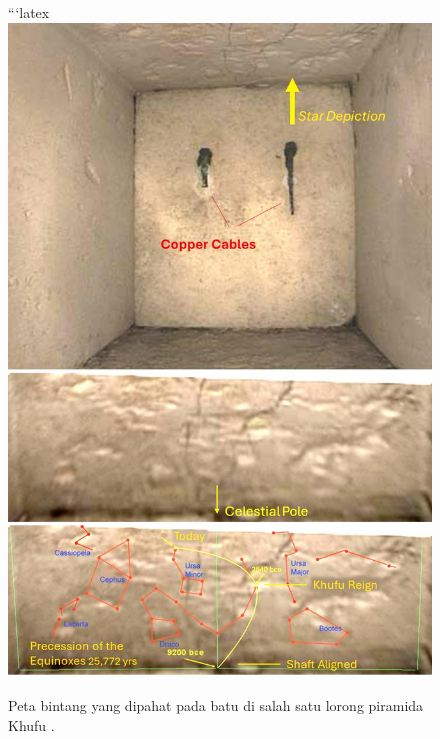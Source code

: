 \documentclass[10pt,twocolumn,letterpaper]{article}
\begin{document}
\begin{figure}[H]
\begin{center}
```latex
   \includegraphics[width=1\linewidth]{star-stone.jpg}
\end{center}
   \caption{Peta bintang yang dipahat pada batu di salah satu lorong piramida Khufu \cite{28}.}
\label{fig:20}
\label{fig:onecol}
\end{figure}
\end{document}
